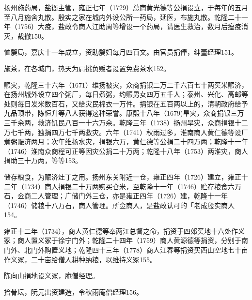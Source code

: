 扬州施药局，盐衙主管，雍正七年（1729）总商黄光德等公捐设立，于每年的五月至八月施舍丸散。殷实之家在城内外设公所一药局，延医，布施丸散。乾隆二十一年（1756）大疫，盐政令商人江助周等增设一个药局，请医生救治，数月后瘟疫消灭，裁撤150。

恤嫠局，嘉庆十一年成立，资助嫠妇每月四百文。由官员捐俸，绅董经理151。

施茶，在各城门，热天为肩挑负贩者设置免费茶水152。

赈灾，乾隆三十六年（1671）维扬被灾，众商捐银二万二千六百七十两买米赈济，在扬州城外设立四个粥厂，每日煮粥，约赈男女四万五千人；泰州、兴化、高邮等处则每日发米数百石，又给灾民棉衣一万件。捐银在五百两以上的，清朝政府给予九品顶带，陈恒升等八人获得这种荣誉。康熙十八年（1679)旱灾，众商捐银三万三千余两，救济饥民八百一十六万余。乾隆三年（1738）扬州旱灾，众商捐银十二万七千两，独捐四万七千两救灾。六年（1741）秋雨过多，淮南商人黄仁德等设厂煮粥赈济两月；次年维扬水灾，捐银六万，黄仁德等公捐二十四万两；乾隆十一年（1746）淮南众商程可正等因灾公捐二十万两；乾隆十八年（1753）两淮灾，商人捐助三十万两，等等153。


储存粮食，为赈济灶丁之用。扬州东关附近一仓，雍正四年（1726）建立，雍正十二年（1734）商人捐银二十万两购买仓米，至乾隆十一年（1746）贮存粮食六万石，佥商二人管理；广储门外三仓，亦是雍正四年（1726）建，乾隆十一年（1746）储粮十八万石，商人管理。所佥商人，是盐政认可的「老成殷实商人154。

\vfill
\begin{BookNotes}
\end{BookNotes}


雍正十二年（1734），商人黄仁德等奉两江总督之命，捐资于四郊买地十六处作义冢；商人置义冢于徐宁门外；乾隆二十四年（1759）商人黄源德等捐资，分别于南门外、北门外购置义地；乾隆四十三年（1778）商人江春等捐资买西山空地七十亩作义冢，二十亩给僧人耕种纳粮，以维持义冢155。

陈向山捐地设义冢，庵僧经理。

拾骨坛，阮元出资建造，令秋雨庵僧经理156。

